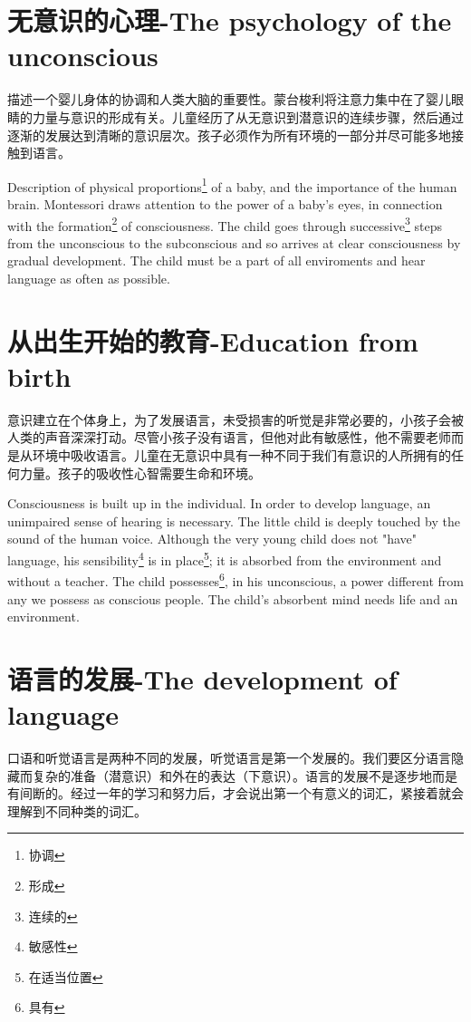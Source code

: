 \documentclass[lang=cn,10pt]{elegantbook}
\begin{document}
\chapter{无意识的心理-The psychology of the unconscious}

描述一个婴儿身体的协调和人类大脑的重要性。蒙台梭利将注意力集中在了婴儿眼睛的力量与意识的形成有关。儿童经历了从无意识到潜意识的连续步骤，然后通过逐渐的发展达到清晰的意识层次。孩子必须作为所有环境的一部分并尽可能多地接触到语言。

Description of physical proportions\footnote{协调} of a baby, and the importance of the human brain. Montessori draws attention to the power of a baby's eyes, in connection with the formation\footnote{形成} of consciousness. The child goes through successive\footnote{连续的} steps from the unconscious to the subconscious and so arrives at clear consciousness by gradual development. The child must be a part of all enviroments and hear language as often as possible.

\chapter{从出生开始的教育-Education from birth}

意识建立在个体身上，为了发展语言，未受损害的听觉是非常必要的，小孩子会被人类的声音深深打动。尽管小孩子没有语言，但他对此有敏感性，他不需要老师而是从环境中吸收语言。儿童在无意识中具有一种不同于我们有意识的人所拥有的任何力量。孩子的吸收性心智需要生命和环境。

Consciousness is built up in the individual. In order to develop language, an unimpaired sense of hearing is necessary. The little child is deeply touched by the sound of the human voice. Although the very young child does not "have" language, his sensibility\footnote{敏感性} is in place\footnote{在适当位置}; it is absorbed from the environment and without a teacher. The child possesses\footnote{具有}, in his unconscious, a power different from any we possess as conscious people. The child's absorbent mind needs life and an environment.

\chapter{语言的发展-The development of language}

口语和听觉语言是两种不同的发展，听觉语言是第一个发展的。我们要区分语言隐藏而复杂的准备（潜意识）和外在的表达（下意识）。语言的发展不是逐步地而是有间断的。经过一年的学习和努力后，才会说出第一个有意义的词汇，紧接着就会理解到不同种类的词汇。
\end{document}
